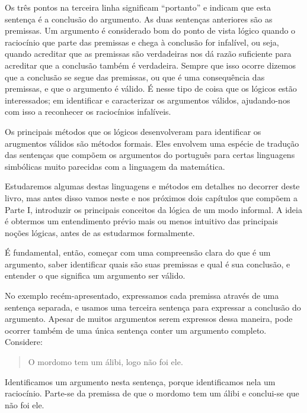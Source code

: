 
\noindent Os três pontos na terceira linha significam ``portanto'' e indicam que esta sentença é a conclusão do argumento. As duas sentenças anteriores são as premissas.
Um argumento é considerado bom do ponto de vista lógico quando o raciocínio que parte das premissas e chega à conclusão for infalível, ou seja, quando acreditar que as premissas são verdadeiras nos dá razão suficiente para acreditar que a conclusão também é verdadeira. Sempre que isso ocorre dizemos que a conclusão se segue das premissas, ou que é uma consequência das premissas, e que o argumento é válido.
É nesse tipo de coisa que os lógicos estão interessados; em identificar e caracterizar os argumentos válidos, ajudando-nos com isso a reconhecer os raciocínios infalíveis.  

Os principais métodos que os lógicos desenvolveram para identificar os arugmentos válidos são métodos formais.
Eles envolvem uma espécie de tradução das sentenças que compõem os argumentos do português para certas linguagens simbólicas muito parecidas com a linguagem da matemática.

Estudaremos algumas destas linguagens e métodos em detalhes no decorrer deste livro, mas antes disso vamos neste e nos próximos dois capítulos que compõem a Parte I, introduzir os principais conceitos da lógica de um modo informal.
A ideia é obtermos um entendimento prévio mais ou menos intuitivo das principais noções lógicas, antes de as estudarmos formalmente.

É fundamental, então, começar com uma compreensão clara do que é um argumento, saber identificar quais são suas premissas e qual é sua conclusão, e entender o que  significa um argumento ser válido.



No exemplo recém-apresentado, expressamos cada premissa através de uma sentença separada, e usamos uma terceira sentença para  expressar a conclusão do argumento.
Apesar de muitos argumentos serem expressos dessa maneira, pode ocorrer também de uma única sentença conter um argumento completo. 
Considere:
	\begin{quote}
		O mordomo tem um álibi, logo não foi ele.
	\end{quote}
Identificamos um argumento nesta sentença, porque identificamos nela um raciocínio. Parte-se da premissa de que o mordomo tem um álibi e conclui-se que não foi ele.

